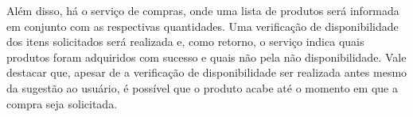 Além disso, há o serviço de compras, onde uma lista de produtos será informada em conjunto com as respectivas quantidades. Uma verificação de disponibilidade dos itens solicitados será realizada e, como retorno, o serviço indica quais produtos foram adquiridos com sucesso e quais não pela não disponibilidade. Vale destacar que, apesar de a verificação de disponibilidade ser realizada antes mesmo da sugestão ao usuário, é possível que o produto acabe até o momento em que a compra seja solicitada.



